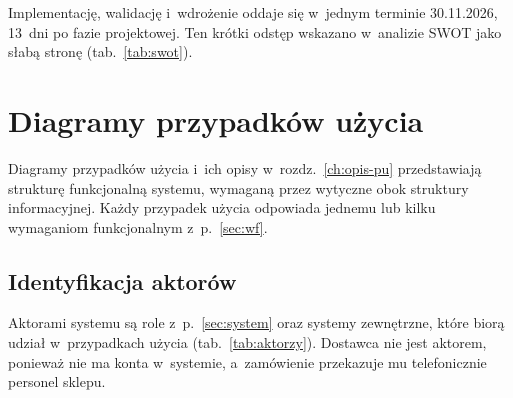 \documentclass[12pt,a4paper,oneside]{article}
\newcounter{pu}
\begin{document}
Implementację, walidację i~wdrożenie oddaje się w~jednym terminie 30.11.2026, 13~dni po fazie projektowej. Ten krótki odstęp wskazano w~analizie SWOT jako słabą stronę (tab.~\ref{tab:swot}).


\clearpage
\section{Diagramy przypadków użycia}
\label{ch:diagramy-pu}

Diagramy przypadków użycia i~ich opisy w~rozdz.~\ref{ch:opis-pu} przedstawiają strukturę funkcjonalną systemu, wymaganą przez wytyczne obok struktury informacyjnej. Każdy przypadek użycia odpowiada jednemu lub kilku wymaganiom funkcjonalnym z~p.~\ref{sec:wf}.

\subsection{Identyfikacja aktorów}
\label{sec:aktorzy}

Aktorami systemu są role z~p.~\ref{sec:system} oraz systemy zewnętrzne, które biorą udział w~przypadkach użycia (tab.~\ref{tab:aktorzy}). Dostawca nie jest aktorem, ponieważ nie ma konta w~systemie, a~zamówienie przekazuje mu telefonicznie personel sklepu.
\end{document}
